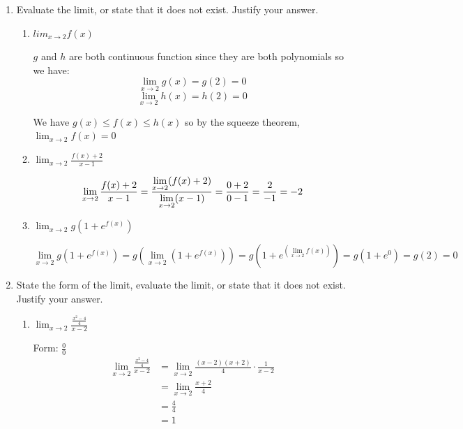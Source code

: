 \documentclass[nooutcomes, handout]{ximera}
\begin{document}
\begin{problem}
\begin{enumerate}
	\item	Evaluate the limit, or state that it does not exist.  Justify your answer.
		\begin{enumerate}
		\item $lim_{x \to 2} f(x)$
			\begin{freeResponse}
		$g$ and $h$ are both continuous function since they are both polynomials so we have:
		\[
		\lim_{x \to 2} g(x)=g(2)=0
		\]
		\[
		\lim_{x \to 2} h(x)=h(2)=0
		\]

		We have $g(x) \le f(x) \le h(x)$ so by the squeeze theorem, $\lim_{x \to 2} f(x)=0$
			\end{freeResponse}

		\item $\lim_{x \to 2} \frac{f(x)+2}{x-1}$
			\begin{freeResponse}
			\[
			\lim_{x \to 2}\frac{f(x)+2}{x-1}=\frac{\lim_{x \to 2}(f(x)+2)}{\lim_{x \to 2}(x-1)}\\
			= \frac{0+2}{0-1}\\
			= \frac{2}{-1}\\
			= -2
			\]
			\end{freeResponse}
		\item $\lim_{x \to 2} g(1+e^{f(x)})$
			\begin{freeResponse}
			\[
			\lim_{x \to 2} g(1+e^{f(x)})= g (\lim_{x \to 2} (1+e^{f(x)}))
			=g (1+e^{(\lim_{x \to 2}f(x))})
			=g(1+e^0)=g(2)=0
			\]
			\end{freeResponse}

		\end{enumerate}
	\item State the form of the limit, evaluate the limit, or state that it does not exist.  Justify your answer.
		\begin{enumerate}
		
		
		\item $\lim_{x \to 2}\frac{\frac{x^2-4}{4}}{x-2}$

		\begin{freeResponse}
		Form: $\frac{{0}}{0}$ \\
		\begin{align*}
		\lim_{x \to 2}\frac{\frac{x^2-4}{4}}{x-2}&=\lim_{x \to 2}\frac{(x-2)(x+2)}{4}\cdot \frac{1}{x-2}\\
		&= \lim_{x \to 2} \frac{x+2}{4}\\
		&= \frac{4}{4}\\
		&= 1
		\end{align*}
		\end{freeResponse}	


\end{enumerate}
\end{enumerate}
\end{problem}
\end{document}
